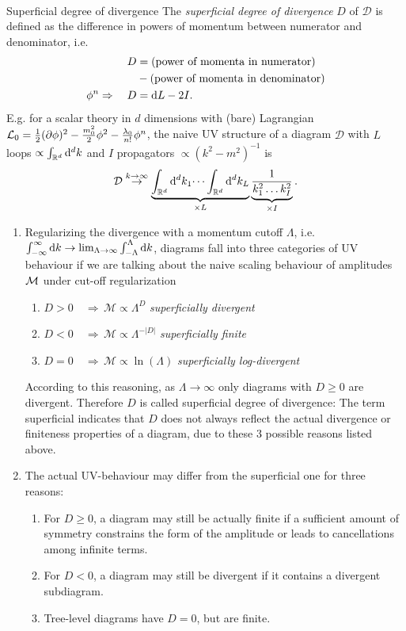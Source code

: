 \\
\begin{mybox}{Superficial degree of divergence}
The  \emph{superficial degree of divergence} $D$ of $\mathcal{D}$ is defined as the difference in powers of momentum between numerator and denominator, i.e.
\begin{align}
	D&= (\text{power of momenta in numerator}) \\
	&- (\text{power of momenta in denominator})\nonumber \\
			\phi^n \Rightarrow \quad D &= \mathrm{d} L - 2 I.
\end{align}
E.g. for a scalar theory in $d$ dimensions with (bare) Lagrangian $\mathcal{L}_0 = \frac{1}{2} (\partial \phi)^2 - \frac{m^2_0}{2} \phi^2 - \frac{\lambda_0}{n!} \phi^n$, the naive UV structure of a diagram $\mathcal{D}$ with $L$ loops $\propto \int_{\mathbb{R}^d} \mathrm{d}^d k$ and $I$ propagators $\propto (k^2-m^2)^{-1}$ is 
\begin{equation}
\mathcal{D} \stackrel{k\rightarrow\infty}{\rightarrow} \underbrace{\int_{\mathbb{R}^d} \mathrm{d}^d k_1 \dots \int_{\mathbb{R}^d} \mathrm{d}^d k_L  }_{\times L} \underbrace{\frac{1}{k^2_1 \dots k^2_I} }_{\times I}.
\end{equation}
\end{mybox}
\begin{enumerate}
	\item Regularizing the divergence with a momentum cutoff $\Lambda$, i.e. $\int_{-\infty}^{\infty} \mathrm{d} k \rightarrow \lim_{\Lambda \rightarrow\infty} \int_{-\Lambda }^{\Lambda} \mathrm{d} k$, diagrams fall into three categories of UV behaviour if we are talking about the naive scaling behaviour of amplitudes $\mathcal{M}$ under cut-off regularization
	\begin{enumerate}
		\item $D>0 \quad \Rightarrow \, \mathcal{M}\propto \Lambda^D$ \emph{superficially  divergent}
		\item $D<0 \quad \Rightarrow \, \mathcal{M}\propto \Lambda^{-|D|}$ \emph{superficially finite}
		\item $D=0 \quad \Rightarrow \, \mathcal{M}\propto \ln(\Lambda)$ \emph{superficially log-divergent}
	\end{enumerate}

According to this reasoning, as $\Lambda \rightarrow\infty$ only diagrams with $D\geq0$ are divergent. Therefore $D$ is called superficial degree of divergence: The term superficial indicates that $D$ does not always reflect the actual divergence or finiteness properties of a diagram, due to these 3 possible reasons listed above.
\item The actual UV-behaviour may differ from the superficial one for three reasons:
\begin{enumerate}
	\item For $D\geq 0$, a diagram may still be actually finite if a sufficient amount of symmetry constrains the form of the amplitude or leads to cancellations among infinite terms.
	\item For $D<0$, a diagram may still be divergent if it contains a divergent subdiagram.
	\item Tree-level diagrams have $D=0$, but are finite.
\end{enumerate}
\end{enumerate}

